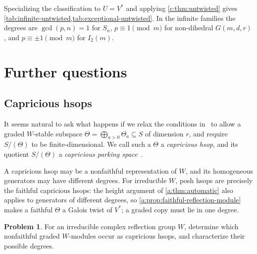 \documentclass[10pt,a4paper]{amsart}
\newcommand{\defn}[1]{\emph{\color{darkblue}#1}}
\theoremstyle{definition}
\newtheorem{problem}[theorem]{Problem}
\begin{document}
Specializing the classification to $U=V^*$ and applying
\cref{c:thm:untwisted} gives
\cref{tab:infinite-untwisted,tab:exceptional-untwisted}. In the infinite
families the degrees are $\gcd(p,n)=1$ for $S_n$, $p\equiv1\pmod m$
for non-dihedral $G(m,d,r)$, and $p\equiv\pm1\pmod m$ for $I_2(m)$.

\section{Further questions}
\label{sec:questions}\label{sec:beyond-hsops}

\subsection{Capricious hsops}

It seems natural to ask what happens if we relax the conditions in~ to allow a graded $W$-stable subspace
$\Theta=\bigoplus_{a>0}\Theta_a\subseteq S$ of dimension $r$, and
require $S/(\Theta)$ to be finite-dimensional. We call such a $\Theta$ a
\defn{capricious hsop}, and its quotient $S/(\Theta)$ a
\defn{capricious parking space}~\cite[Section~6, p.~1274]{KonheimWeiss}.

A capricious hsop may be a nonfaithful representation of $W$, and its
homogeneous generators may have different degrees. For irreducible $W$, posh hsops are
precisely the faithful capricious hsops: the height argument of
\cref{a:thm:automatic} also applies to generators of different degrees,
so \cref{a:prop:faithful-reflection-module} makes a faithful $\Theta$
a Galois twist of $V^*$; a graded copy must lie in one degree.

\begin{problem}\label{prob:nonfaithful-hsops}
For an irreducible complex reflection group $W$, determine which
nonfaithful graded $W$-modules occur as capricious hsops,
and characterize their possible degrees.
\end{problem}

\end{document}

